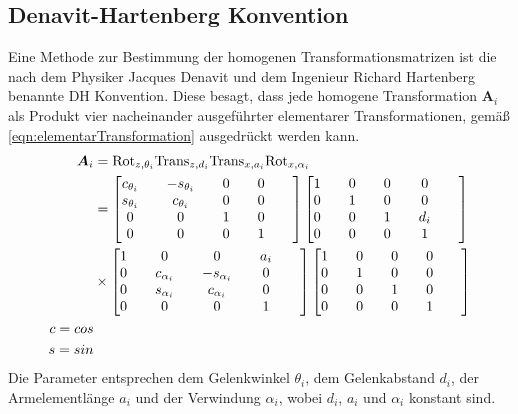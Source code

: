 \subsection*{Denavit-Hartenberg Konvention}
Eine Methode zur Bestimmung der homogenen Transformationsmatrizen ist die nach  dem Physiker Jacques Denavit und dem Ingenieur Richard Hartenberg benannte DH Konvention. Diese besagt, dass jede homogene Transformation $\bm{A}_i$ als Produkt vier nacheinander ausgeführter elementarer Transformationen, gemäß \ref{eqn:elementarTransformation} ausgedrückt werden kann. 
\begin{align}
	\label{eqn:elementarTransformation}
	\bm{A}_i &= \text{Rot}_{z,\theta_i}\text{Trans}_{z,d_i}\text{Trans}_{x,a_i}\text{Rot}_{x,\alpha_i} \\
	&= \left[\begin{matrix}
		c_{\theta_i} &\quad -s_{\theta_i} &\quad 0 &\quad 0 \\
		s_{\theta_i} &\quad c_{\theta_i} &\quad 0 &\quad 0 \\
		0 &\quad 0 &\quad 1 &\quad 0 &\quad \\ 
		0 &\quad 0 &\quad 0 &\quad 1 &\quad 
	\end{matrix}\right] 
	\left[\begin{matrix}
		1 &\quad 0 &\quad 0 &\quad 0 \\
		0 &\quad 1 &\quad 0 &\quad 0 \\
		0 &\quad 0 &\quad 1 &\quad d_i &\quad \\ 
		0 &\quad 0 &\quad 0 &\quad 1 &\quad 
	\end{matrix}\right] \notag \\
	& \times
	\left[\begin{matrix}
		1 &\quad 0 &\quad 0 &\quad a_i \\
		0 &\quad c_{\alpha_i} &\quad -s_{\alpha_i} &\quad 0 \\
		0 &\quad s_{\alpha_i} &\quad c_{\alpha_i} &\quad 0 &\quad \\ 
		0 &\quad 0 &\quad 0 &\quad 1 &\quad 
	\end{matrix}\right]
	\left[\begin{matrix}
		1 &\quad 0 &\quad 0 &\quad 0 \\
		0 &\quad 1 &\quad 0 &\quad 0 \\
		0 &\quad 0 &\quad 1 &\quad 0 &\quad \\ 
		0 &\quad 0 &\quad 0 &\quad 1 &\quad 
	\end{matrix}\right]
	\notag \\
	c = cos\notag \\
	s = sin \notag 
\end{align}
Die Parameter entsprechen dem Gelenkwinkel $\theta_i$, dem Gelenkabstand $d_i$, der Armelementlänge $a_i$ und der Verwindung $\alpha_i$, wobei $d_i$, $a_i$ und $\alpha_i$ konstant sind. \cite[S.~79]{Spong.2020}
%
